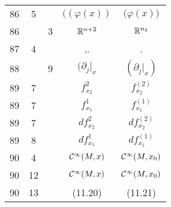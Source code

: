 \documentclass[a4paper,11pt]{article}
\begin{document}
\begin{center}
\begin{tabular}{|c|c|c|c|c|}
    86  & \hphantom{0}5 & & $( ( \varphi( x ) )$ & $\big( \varphi( x ) \big)$ \\
    86  & & \hphantom{0}3 & $\mathbb{R}^{ n + 2 }$ & $\mathbb{R}^{ n_{ 2 } }$ \\
    87  & \hphantom{0}4 & & ,. & . \\
    88  & & \hphantom{0}9 & $( \partial_{ j }|_{ x }$ & $( \partial_{ j }|_{ x } )$ \\
    89  & \hphantom{0}7 & & $f_{ x_{ 2 } }^{ 2 }$ & $f_{ x_{ 2 } }^{ ( 2 ) }$ \\
    89  & \hphantom{0}7 & & $f_{ x_{ 1 } }^{ 1 }$ & $f_{ x_{ 1 } }^{ ( 1 ) }$ \\
    89  & \hphantom{0}7 & & $d f_{ x_{ 2 } }^{ 2 }$
    & $d f_{ x_{ 2 } }^{ ( 2 ) }$ \\
    89  & \hphantom{0}8 & & $d f_{ x_{ 1 } }^{ 1 }$
    & $d f_{ x_{ 1 } }^{ ( 1 ) }$ \\
    90  & \hphantom{0}4 & & $\mathcal{C}^{ \infty }( M, x )$
    & $\mathcal{C}^{ \infty }( M, x_{ 0 } )$ \\
    90  & 12 & & $\mathcal{C}^{ \infty }( M, x )$
           & $\mathcal{C}^{ \infty }( M, x_{ 0 } )$ \\
    90  & 13 & & (11.20) & (11.21) \\[0.3em]
    \hline
  \end{tabular}





  \newpage


\end{center}
\end{document}
